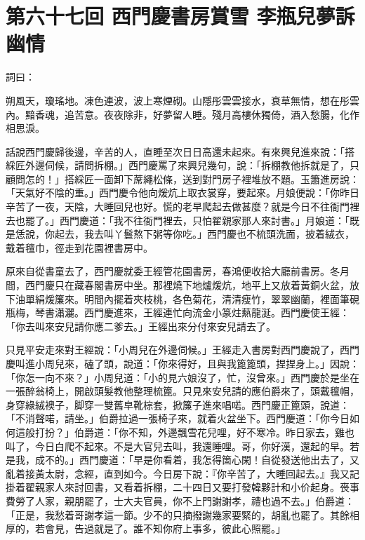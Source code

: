 
\chapter*{第六十七回 西門慶書房賞雪 李瓶兒夢訴幽情}


詞曰：

\begin{myquote} 
朔風天，瓊瑤地。凍色連波，波上寒煙砌。山隱彤雲雲接水，衰草無情，想在彤雲內。黯香魂，追苦意。夜夜除非，好夢留人睡。殘月高樓休獨倚，酒入愁腸，化作相思淚。

\end{myquote} 

話說西門慶歸後邊，辛苦的人，直睡至次日日高還未起來。有來興兒進來說：「搭綵匠外邊伺候，請問拆棚。」西門慶罵了來興兒幾句，說：「拆棚教他拆就是了，只顧問怎的！」{}搭綵匠一面卸下蓆繩松條，送到對門房子裡堆放不題。玉簫進房說：「天氣好不陰的重。」西門慶令他向煖炕上取衣裳穿，要起來。月娘便說：「你昨日辛苦了一夜，天陰，大睡回兒也好。慌的老早爬起去做甚麼？就是今日不往衙門裡去也罷了。」西門慶道：「我不往衙門裡去，只怕翟親家那人來討書。」月娘道：「既是恁說，你起去，我去叫丫鬟熬下粥等你吃。」西門慶也不梳頭洗面，披着絨衣，戴着氊巾，徑走到花園裡書房中。

原來自從書童去了，西門慶就委王經管花園書房，春鴻便收拾大廳前書房。冬月間，西門慶只在藏春閣書房中坐。那裡燒下地爐煖炕，地平上又放着黃銅火盆，放下油單絹煖簾來。明間內擺着夾枝桃，各色菊花，清清瘦竹，翠翠幽蘭，裡面筆硯瓶梅，琴書瀟灑。西門慶進來，王經連忙向流金小篆炷爇龍涎。西門慶使王經：「你去叫來安兒請你應二爹去。」王經出來分付來安兒請去了。

只見平安走來對王經說：「小周兒在外邊伺候。」王經走入書房對西門慶說了，西門慶叫進小周兒來，磕了頭，說道：「你來得好，且與我篦篦頭，捏捏身上。」因說：「你怎一向不來？」小周兒道：「小的見六娘沒了，忙，沒曾來。」西門慶於是坐在一張醉翁椅上，開啟頭髮教他整理梳篦。只見來安兒請的應伯爵來了，頭戴氊帽，身穿綠絨襖子，脚穿一雙舊皁靴棕套，掀簾子進來唱喏。西門慶正篦頭，說道：「不消聲喏，請坐。」伯爵拉過一張椅子來，就着火盆坐下。西門慶道：「你今日如何這般打扮？」伯爵道：「你不知，外邊飄雪花兒哩，好不寒冷。昨日家去，雞也叫了，今日白爬不起來。不是大官兒去叫，我還睡哩。哥，你好漢，還起的早。若是我，成不的。」{}西門慶道：「早是你看着，我怎得箇心閑！自從發送他出去了，又亂着接黃太尉，念經，直到如今。今日房下說：『你辛苦了，大睡回起去。』我又記掛着翟親家人來討回書，又看着拆棚，二十四日又要打發韓夥計和小价起身。䘮事費勞了人家，親朋罷了，士大夫官員，你不上門謝謝孝，禮也過不去。」伯爵道：「正是，我愁着哥謝孝這一節。少不的只摘撥謝幾家要緊的，胡亂也罷了。其餘相厚的，若會見，告過就是了。誰不知你府上事多，彼此心照罷。」

